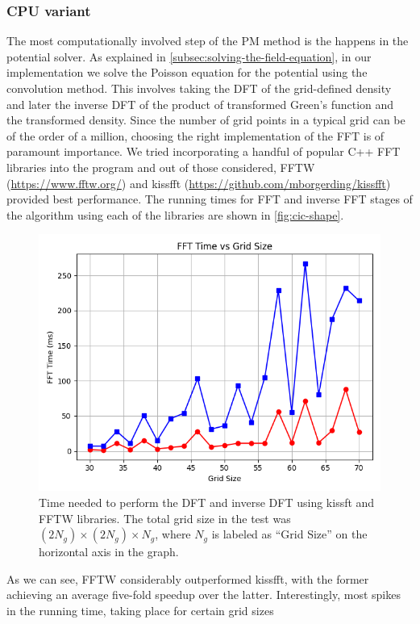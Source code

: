 \subsubsection{CPU variant}
The most computationally involved step of the PM method is the happens in the potential solver.
As explained in \autoref{subsec:solving-the-field-equation}, in our implementation we solve the Poisson equation for the potential using the convolution method.
This involves taking the DFT of the grid-defined density and later the inverse DFT of the product of transformed Green's function and the transformed density.
Since the number of grid points in a typical grid can be of the order of a million, choosing the right implementation of the FFT is of paramount importance.
We tried incorporating a handful of popular C++ FFT libraries into the program and out of those considered, FFTW (\url{https://www.fftw.org/}) and kissfft (\url{https://github.com/mborgerding/kissfft}) provided best performance.
The running times for FFT and inverse FFT stages of the algorithm using each of the libraries are shown in \autoref{fig:cic-shape}.
\begin{figure}[htp]
    \centering
    \includegraphics[scale=0.5]{img/fft_time.png}
    \caption{Time needed to perform the DFT and inverse DFT using kissft and FFTW libraries.
        The total grid size in the test was $(2N_g)\times (2N_g) \times N_g$, where $N_g$ is labeled as ``Grid Size'' on the horizontal axis in the graph.}
    \label{fig:fft-time}
\end{figure}
As we can see, FFTW considerably outperformed kissfft, with the former achieving an average five-fold speedup over the latter.
Interestingly, most spikes in the running time, taking place for certain grid sizes

